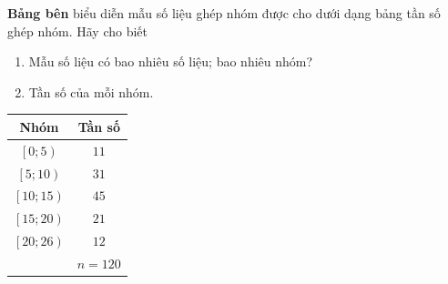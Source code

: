 \begin{bt}%
	\immini
	{
		\textbf{Bảng bên} biểu diễn mẫu số liệu ghép nhóm được cho dưới dạng bảng tần số ghép nhóm. Hãy cho biết 
		\begin{enumerate}
			\item Mẫu số liệu có bao nhiêu số liệu; bao nhiêu nhóm?
			\item Tần số của mỗi nhóm.
		\end{enumerate}
	}
	{
		\begin{tabular}{|c|c|}
			\hline
			\textbf{Nhóm} & \textbf{Tần số}\\ 
			\hline
			$\left[0;5\right)$ & $11$\\
			\hline
			$\left[5;10\right)$ & $31$\\
			\hline
			$\left[10;15\right)$ & $45$\\
			\hline
			$\left[15;20\right)$ & $21$\\
			\hline
			$\left[20;26\right)$ & $12$\\
			\hline
			& $n = 120$ \\
			\hline
		\end{tabular}
	}
\end{bt}

